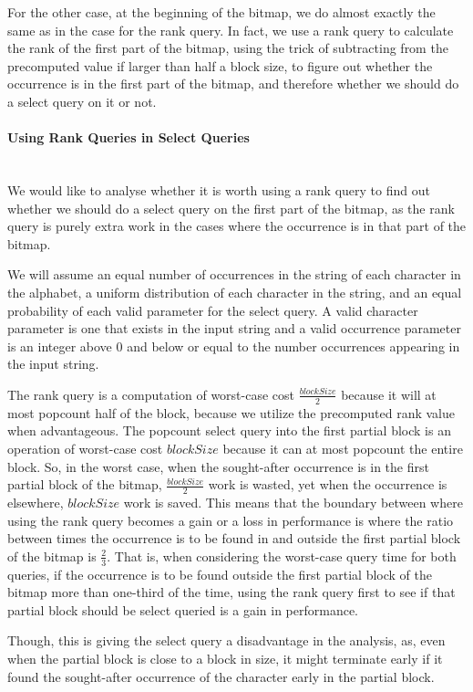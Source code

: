 For the other case, at the beginning of the bitmap, we do almost exactly the same as in the case for the rank query.
In fact, we use a rank query to calculate the rank of the first part of the bitmap, using the trick of subtracting from the precomputed value if larger than half a block size, to figure out whether the occurrence is in the first part of the bitmap, and therefore whether we should do a select query on it or not.

\paragraph{Using Rank Queries in Select Queries}~\\
We would like to analyse whether it is worth using a rank query to find out whether we should do a select query on the first part of the bitmap, as the rank query is purely extra work in the cases where the occurrence is in that part of the bitmap.

We will assume an equal number of occurrences in the string of each character in the alphabet, a uniform distribution of each character in the string, and an equal probability of each valid parameter for the select query.
A valid character parameter is one that exists in the input string and a valid occurrence parameter is an integer above 0 and below or equal to the number occurrences appearing in the input string.

The rank query is a computation of worst-case cost $\frac{blockSize}{2}$ because it will at most popcount half of the block, because we utilize the precomputed rank value when advantageous.
The popcount select query into the first partial block is an operation of worst-case cost $blockSize$ because it can at most popcount the entire block.
So, in the worst case, when the sought-after occurrence is in the first partial block of the bitmap, $\frac{blockSize}{2}$ work is wasted, yet when the occurrence is elsewhere, $blockSize$ work is saved.
This means that the boundary between where using the rank query becomes a gain or a loss in performance is where the ratio between times the occurrence is to be found in and outside the first partial block of the bitmap is $\frac{2}{3}$.
That is, when considering the worst-case query time for both queries, if the occurrence is to be found outside the first partial block of the bitmap more than one-third of the time, using the rank query first to see if that partial block should be select queried is a gain in performance.

Though, this is giving the select query a disadvantage in the analysis, as, even when the partial block is close to a block in size, it might terminate early if it found the sought-after occurrence of the character early in the partial block.

